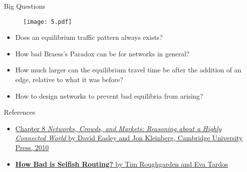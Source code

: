 \documentclass[10pt]{beamer}  %
\begin{document}
\begin{frame}{Big Questions}
    \begin{figure}
        \centering
        \texttt{[image: 5.pdf]}
    \end{figure}
    \begin{itemize}
        \item Does an equilibrium traffic pattern always exists?
        \item How bad Braess's Paradox can be for networks in general?
        \item How much larger can the equilibrium travel time be after the addition of an edge, relative to what it was before?
        \item How to design networks to prevent bad equilibria from arising?
    \end{itemize}
\end{frame}

\begin{frame}{References}
    \begin{itemize}
        \item  \href{http://www.cs.cornell.edu/home/kleinber/networks-book/}{Chapter 8 \emph{Networks, Crowds, and Markets: Reasoning about a Highly Connected World} by David Easley and Jon Kleinberg, Cambridge University Press, 2010}
        \item \href{https://theory.stanford.edu/~tim/papers/routing.pdf}{\textbf{How Bad is Selfish Routing?} by Tim Roughgarden and Eva Tardos}
    \end{itemize}
\end{frame}
\end{document}
